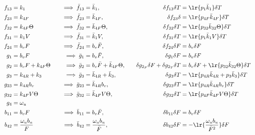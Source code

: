 \begin{align*}
    f_{13} &= k_1 \quad&
    \implies \bar f_{13} &= \bar k_{1}, \quad&
    \delta f_{13} \delta T &= \lr{ p_{1} \bar k_{1} } \delta T\\
    f_{23} &= k_{4F} \quad &
    \implies \bar f_{23} &= \bar k_{4F}, \quad &
    \delta f_{23} \delta &= \lr{ p_{4F} \bar k_{4F} } \delta T\\
    f_{32} &= k_{4F} \Theta \quad &
    \implies \bar f_{32} &= \bar k_{4F} \Theta, \quad &
    \delta f_{32} \delta T &= \lr{ p_{32}  \bar k_{32} \Theta } \delta T
    \\
    f_{31} &= k_1 V \quad &
    \implies \bar f_{31} &= \bar k_1 V, \quad &
    \delta f_{31} \delta T &= \lr{ p_1 \bar k_1 V } \delta T
    \\
    f_{24} &= b_v F
    \quad &
    \implies \bar f_{24} &= b_v \bar F,
    \quad &
    \delta f_{24} \delta F &= b_v \delta F
    \\
    g_1    &= b_v F
    \quad &
    \implies \bar g_1 &= b_v \bar F,
    \quad &
    \delta g_1 \delta F &= b_v \delta F
    \\
    g_2    &= b_v F + k_{4F} \Theta
    \quad &
    \implies \bar g_2 &= b_v \bar F + \bar k_{4F} \Theta,
    \quad &
    \delta g_{2_F} \delta F + \delta g_{2_T} \delta T &= b_v \delta F +  \lr{ p_{32}  \bar k_{32}  \Theta } \delta T
    \\
    g_{3}  &= k_{4R}+k_3
    \quad &
    \implies \bar g_3 &= \bar k_{4R} + \bar k_3,
    \quad &
    \delta g_3 \delta T&= \lr{ p_{4R} \bar k_{4R} + p_3 \bar k_3} \delta T
    \\
    g_{23} &= k_{4R} b_v
    \quad &
    \implies \bar g_{23} &= \bar k_{4R} b_v,
    \quad &
    \delta g_{23} \delta T &= \lr{ p_{4R} \bar k_{4R} b_v } \delta T
    \\
    g_{32} &= k_{4F} V \Theta
    \quad &
    \implies \bar g_{32} &= \bar k_{4F} V \Theta,
    \quad &
    \delta g_{32} \delta T &= \lr{ p_{4F} \bar k_{4F} V \Theta } \delta T
    \\
    g_4 &= \omega_u
    \\
    b_{11} &= b_v F
    \quad &
    \implies \bar b_{11} &= b_v \bar F,
    \quad &
    \delta b_{11} \delta F &= b_v \delta F
    \\
    b_{42} &= \frac{\omega_u b_u}{F}
    \quad &
    \implies \bar b_{42} &= \frac{\omega_u b_u}{\bar F},
    \quad &
    \delta b_{42} \delta F &= -\lr{\frac{\omega_u b_u}{\bar F^2}} \delta F
\end{align*}


